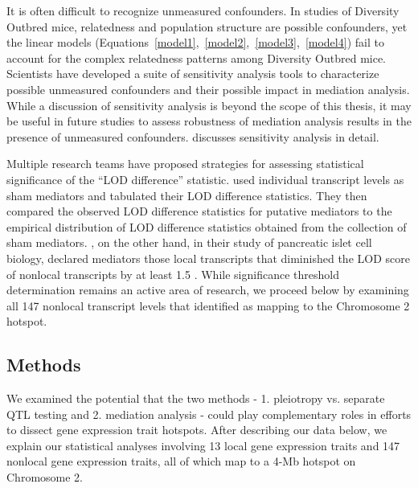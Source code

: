 \documentclass{book}
\begin{document}
It is often difficult to recognize unmeasured confounders. In studies of Diversity Outbred mice, relatedness and population structure are possible confounders, yet the linear models (Equations~\ref{model1},~\ref{model2},~\ref{model3},~\ref{model4}) fail to account for the complex relatedness patterns among Diversity Outbred mice. Scientists have developed a suite of sensitivity analysis tools to characterize possible unmeasured confounders and their possible impact in mediation analysis. While a discussion of sensitivity analysis is beyond the scope of this thesis, it may be useful in future studies to assess robustness of mediation analysis results in the presence of unmeasured confounders. \citet{vanderweele2015explanation} discusses sensitivity analysis in detail. 








Multiple research teams have proposed strategies for assessing statistical significance of the ``LOD difference'' statistic. \citet{chick2016defining} used individual transcript levels as sham mediators and tabulated their LOD difference statistics. They then compared the observed LOD difference statistics for putative mediators to the empirical distribution of LOD difference statistics obtained from the collection of sham mediators. \citet{keller2018genetic}, on the other hand, in their study of pancreatic islet cell biology, declared mediators those local transcripts that diminished the LOD score of nonlocal transcripts by at least 1.5 \citep{keller2018genetic}. While significance threshold determination remains an active area of research, we proceed below by examining all 147 nonlocal transcript levels that \citet{keller2018genetic} identified as mapping to the Chromosome 2 hotspot.



\subsection{Methods}

We examined the potential that the two methods - 1. pleiotropy vs. separate QTL testing and 2. mediation analysis - could play complementary roles in efforts to dissect gene expression trait hotspots. After describing our data below, we explain our statistical analyses involving 13 local gene expression traits and 147 nonlocal gene expression traits, all of which map to a 4-Mb hotspot on Chromosome 2.
\end{document}
